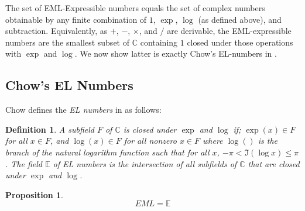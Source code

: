 \documentclass[a4paper,10pt]{article}
\newtheorem{definition}{Definition}
\newtheorem{proposition}{Proposition}
\begin{document}
The set of EML-Expressible numbers equals the set of complex numbers obtainable by any finite combination of $1$, $\exp$, $\log$ (as defined above), and subtraction. Equivalently, as $+$, $-$, $\times$, and $/$ are derivable, the EML-expressible numbers are the smallest subset of $\mathbb{C}$ containing $1$ closed under those operations with $\exp$ and $\log$. We now show latter is exactly Chow's EL-numbers in \cite{Chow1999}.

\subsection{Chow's EL Numbers}

Chow defines the \emph{EL numbers} in \cite{Chow1999} as follows:

\begin{definition}\label{def:elnums}
    A subfield $F$ of $\mathbb{C}$ is closed under $\exp$ and $\log$ if;  $\exp(x) \in F$ for all $x \in F$, and $\log(x) \in F$ for all nonzero $x \in F$ where $\log()$ is the branch of the natural logarithm function such that for all $x$, $- \pi < \Im(\log x) \leq \pi $. The field $\mathbb{E}$ of \emph{EL numbers} is the intersection of all subfields of $\mathbb{C}$ that are closed under $\exp$ and $\log$. 
\end{definition}

\begin{proposition}
    $$ EML = \mathbb{E} $$
\end{proposition}
\end{document}
